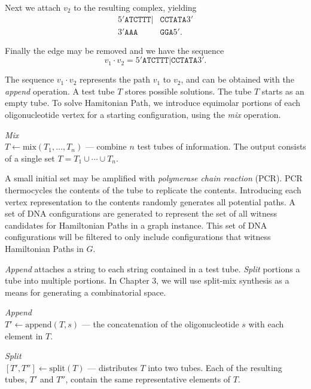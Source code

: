 \noindent Next we attach $v_2$ to the resulting complex, yielding
\begin{align*}
 5'\texttt{ATCTTT}|&\texttt{CCTATA}3'\\
  3'\texttt{AAA}&\texttt{GGA}5'.
\end{align*}

\noindent Finally the edge may be removed and we have the sequence
\[
v_1 \cdot v_2 = 5'\texttt{ATCTTT}|\texttt{CCTATA}3'.
\]

The sequence $v_1 \cdot v_2$ represents the path $v_1$ to $v_2$, and can be obtained with the \textit{append} operation.  A test tube $T$ stores possible solutions.  The tube $T$ starts as an empty tube.  To solve {\sc Hamitonian Path}, we introduce equimolar portions of each oligonucleotide vertex for a starting configuration, using the \textit{mix} operation.

\begin{definition}
\textit{Mix}\\
$ T \leftarrow \text{mix}( T_1, \ldots , T_n)$ --- combine $n$ test tubes of information.  The output consists of a single set $T = T_1 \cup \cdots \cup T_n$.
\end{definition}

A small initial set may be amplified with \textit{polymerase chain reaction} (PCR).  PCR thermocycles the contents of the tube to replicate the contents.  Introducing each vertex representation to the contents randomly generates all potential paths.  A set of DNA configurations are generated to represent the set of all witness candidates for Hamiltonian Paths in a graph instance.  This set of DNA configurations will be filtered to only include configurations that witness Hamiltonian Paths in $G$.

\textit{Append} attaches a string to each string contained in a test tube.  \textit{Split} portions a tube into multiple portions.  In Chapter 3, we will use split-mix synthesis as a means for generating a combinatorial space.

\begin{definition}
\textit{Append}\\
$T' \leftarrow \text{append}( T, s)$ --- the concatenation of the oligonucleotide $s$ with each element in $T$.  
\end{definition}

\begin{definition}
\textit{Split}\\
$[T', T''] \leftarrow \text{split}( T)$ --- distributes $T$ into two tubes.  Each of the resulting tubes, $T'$ and $T''$,  contain the same representative elements of $T$.
\end{definition}

